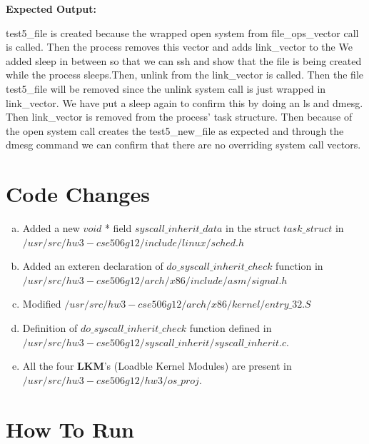 \documentclass[11pt]{article}
\begin{document}
\noindent
\textbf{Expected Output: }

test5\_file is created because the wrapped open system from file\_ops\_vector call is called. Then the process removes this vector and adds link\_vector to the We added sleep in between so that we can ssh and show that the file is being created while the process sleeps.Then, unlink from the link\_vector is called. Then the file test5\_file will be removed since the unlink system call is just wrapped in link\_vector. We have put a sleep again to confirm this by doing an ls and dmesg. Then link\_vector is removed from the process' task structure. Then because of the open system call creates the test5\_new\_file as expected and through the dmesg command we can confirm that there are no overriding system call vectors. 

\section{Code Changes}

\begin{enumerate}[(a)]
\item
Added a new $void$ * field $syscall\_inherit\_data$ in the struct $task\_struct$ in $/usr/src/hw3-cse506g12/include/linux/sched.h$

\item
Added an exteren declaration of $do\_syscall\_inherit\_check$ function in $/usr/src/hw3-cse506g12/arch/x86/include/asm/signal.h$ 

\item
Modified $/usr/src/hw3-cse506g12/arch/x86/kernel/entry\_32.S$ 

\item
Definition of $do\_syscall\_inherit\_check$ function defined in $/usr/src/hw3-cse506g12/syscall\_inherit/syscall\_inherit.c$.

\item
All the four \textbf{LKM}'s (Loadble Kernel Modules) are present in $/usr/src/hw3-cse506g12/hw3/os\_proj$. 

\end{enumerate}

\section{How To Run}
\end{document}
